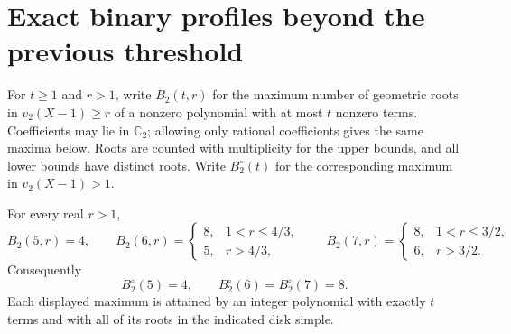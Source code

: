 \section{Exact binary profiles beyond the previous threshold}\label{sec:binary-profile}
For $t\ge1$ and $r>1$, write $B_2(t,r)$ for the maximum number of
geometric roots in $v_2(X-1)\ge r$ of a nonzero polynomial with at most
$t$ nonzero terms. Coefficients may lie in $\mathbb C_2$; allowing only
rational coefficients gives the same maxima below. Roots are counted with
multiplicity for the upper bounds, and all lower bounds have distinct roots.
Write $B_2^\circ(t)$ for the corresponding maximum in $v_2(X-1)>1$.

\begin{theorem}\label{thm:binary-profile}
For every real $r>1$,
\[
 B_2(5,r)=4,
 \qquad
 B_2(6,r)=
 \begin{cases}8,&1<r\le4/3,\\5,&r>4/3,\end{cases}
 \qquad
 B_2(7,r)=
 \begin{cases}8,&1<r\le3/2,\\6,&r>3/2.\end{cases}
\]
Consequently
\[
 B_2^\circ(5)=4,\qquad B_2^\circ(6)=B_2^\circ(7)=8.
\]
Each displayed maximum is attained by an integer polynomial with exactly
$t$ terms and with all of its roots in the indicated disk simple.
\end{theorem}

